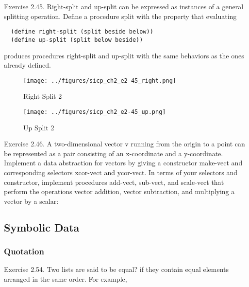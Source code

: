 Exercise 2.45.  Right-split and up-split can be expressed as instances of a general splitting operation. Define a procedure split with the property that evaluating
\begin{verbatim}
  (define right-split (split beside below))
  (define up-split (split below beside))
\end{verbatim}
produces procedures right-split and up-split with the same behaviors as the ones already defined.

\begin{figure}[H]
\begin{center}
\texttt{[image: ../figures/sicp\_ch2\_e2-45\_right.png]}
\end{center}
\caption{Right Split 2}
\label{fig:right_split_2}
\end{figure}

\begin{figure}[H]
\begin{center}
\texttt{[image: ../figures/sicp\_ch2\_e2-45\_up.png]}
\end{center}
\caption{Up Split 2}
\label{fig:up_split_2}
\end{figure}

Exercise 2.46.  A two-dimensional vector v running from the origin to a point can be represented as a pair consisting of an x-coordinate and a y-coordinate. Implement a data abstraction for vectors by giving a constructor make-vect and corresponding selectors xcor-vect and ycor-vect. In terms of your selectors and constructor, implement procedures add-vect, sub-vect, and scale-vect that perform the operations vector addition, vector subtraction, and multiplying a vector by a scalar:

        \subsection{Symbolic Data}
            \subsubsection{Quotation}

Exercise 2.54. Two lists are said to be equal? if they contain equal 
elements arranged in the same order. For example,
\newline

